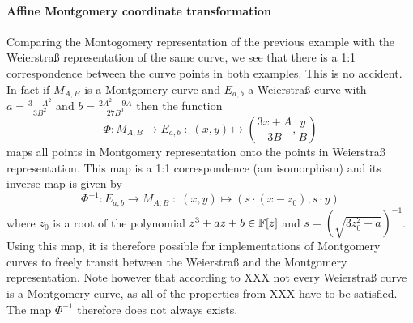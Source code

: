 \paragraph{Affine Montgomery coordinate transformation} Comparing the Montogomery representation of the previous example with the Weierstraß representation of the same curve, we see that there is a 1:1 correspondence between the curve points in both examples. This is no accident. In fact if $M_{A,B}$ is a Montgomery curve and $E_{a,b}$ a Weierstraß curve with $a = \frac{3-A^2}{3B^2}$ and $b= \frac{2A^2 -9A}{27B^3}$ then the function
\begin{equation}
\Phi: M_{A,B} \to E_{a,b}\; : \; (x,y) \mapsto \left(\frac{3x + A}{3B}, \frac{y}{B}\right)
\end{equation}
maps all points in Montgomery representation onto the points in Weierstraß representation. This map is a 1:1 correspondence (am isomorphism) and its inverse map is given by
\begin{equation}
\Phi^{-1}: E_{a,b} \to M_{A,B}\; : \; (x,y) \mapsto \left(s\cdot(x-z_0), s\cdot y\right)
\end{equation}
where $z_0$ is a root of the polynomial $z^3 + a z + b \in \mathbb{F}[z]$ and $s=({\sqrt{3z_0^{2}+a}})^{-1}$. Using this map, it is therefore possible for implementations of Montgomery curves to freely transit between the Weierstraß and the Montgomery representation. Note however that according to XXX not every Weierstraß curve is a Montgomery curve, as all of the properties from XXX have to be satisfied. The map $\Phi^{-1}$ therefore does not always exists. 

